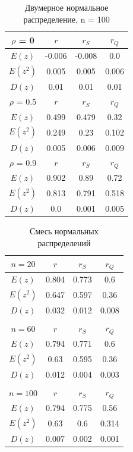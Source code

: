 \documentclass[../body.tex]{subfiles}
\begin{document}
	\begin{table}[H]
		\centering
		\begin{tabular}{| c | c | c | c |}
			\hline \hline
			$\rho$ = 0   & $r$    & $r_S$  & $r_Q$ \\ \hline
			$E(z)$       & -0.006 & -0.008 & 0.0   \\ \hline
			$E(z^2)$     & 0.005  & 0.005  & 0.006 \\ \hline
			$D(z)$       & 0.01   & 0.01   & 0.01  \\ \hline
			$\rho$ = 0.5 & $r$    & $r_S$  & $r_Q$ \\ \hline
			$E(z)$       & 0.499  & 0.479  & 0.32  \\ \hline
			$E(z^2)$     & 0.249  & 0.23   & 0.102 \\ \hline
			$D(z)$       & 0.005  & 0.006  & 0.009 \\ \hline
			$\rho$ = 0.9 & $r$    & $r_S$  & $r_Q$ \\ \hline
			$E(z)$       & 0.902  & 0.89   & 0.72  \\ \hline
			$E(z^2)$     & 0.813  & 0.791  & 0.518 \\ \hline
			$D(z)$       & 0.0    & 0.001  & 0.005 \\
			\hline \hline
		\end{tabular}
		\caption{Двумерное нормальное распределение, n = 100}
		\label{tab:n=100}
	\end{table}

	\begin{table}[H]
		\centering
		\begin{tabular}{| c | c | c | c |}
			\hline  \hline
			$n = 20$  & $r$   & $r_S$ & $r_Q$ \\ \hline
			$E(z)$    & 0.804 & 0.773 & 0.6   \\ \hline
			$E(z^2)$  & 0.647 & 0.597 & 0.36  \\ \hline
			$D(z)$    & 0.032 & 0.012 & 0.008  \\ \hline
			&&&\\ \hline
			$n = 60$  & $r$   & $r_S$ & $r_Q$ \\ \hline
			$E(z)$    & 0.794 & 0.771 & 0.6   \\ \hline
			$E(z^2)$  & 0.63  & 0.595 & 0.36  \\ \hline
			$D(z)$    & 0.012 & 0.004 & 0.003 \\ \hline
			&&&\\ \hline
			$n = 100$ & $r$   & $r_S$ & $r_Q$ \\ \hline
			$E(z)$    & 0.794 & 0.775 & 0.56  \\ \hline
			$E(z^2)$  & 0.63  & 0.6   & 0.314 \\ \hline
			$D(z)$    & 0.007 & 0.002 & 0.001  \\
			\hline  \hline
		\end{tabular}
		\caption{Смесь нормальных распределений}
		\label{tab:mixed}
	\end{table}
\end{document}
